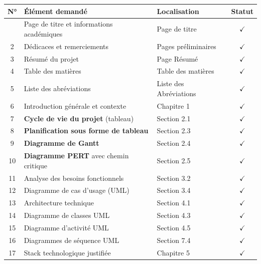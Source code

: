 \documentclass[12pt,a4paper,openany]{report}
\begin{document}
\begin{longtable}{clp{4.8cm}c}
  \toprule
  \textbf{N°} & \textbf{Élément demandé} & \textbf{Localisation} & \textbf{Statut} \\
  \midrule
  \endhead
  \bottomrule
  \endfoot
  1  & Page de titre et informations académiques      & Page de titre               & $\checkmark$ \\
  2  & Dédicaces et remerciements                     & Pages préliminaires         & $\checkmark$ \\
  3  & Résumé du projet                               & Page Résumé                 & $\checkmark$ \\
  4  & Table des matières                             & Table des matières          & $\checkmark$ \\
  5  & Liste des abréviations                         & Liste des Abréviations      & $\checkmark$ \\
  6  & Introduction générale et contexte              & Chapitre 1                  & $\checkmark$ \\
  7  & \textbf{Cycle de vie du projet} (tableau)      & Section 2.1                 & $\checkmark$ \\
  8  & \textbf{Planification sous forme de tableau}   & Section 2.3                 & $\checkmark$ \\
  9  & \textbf{Diagramme de Gantt}                    & Section 2.4                 & $\checkmark$ \\
  10 & \textbf{Diagramme PERT} avec chemin critique   & Section 2.5                 & $\checkmark$ \\
  11 & Analyse des besoins fonctionnels               & Section 3.2                 & $\checkmark$ \\
  12 & Diagramme de cas d'usage (UML)                 & Section 3.4                 & $\checkmark$ \\
  13 & Architecture technique                         & Section 4.1                 & $\checkmark$ \\
  14 & Diagramme de classes UML                       & Section 4.3                 & $\checkmark$ \\
  15 & Diagramme d'activité UML                       & Section 4.5                 & $\checkmark$ \\
  16 & Diagrammes de séquence UML                     & Section 7.4                 & $\checkmark$ \\
  17 & Stack technologique justifiée                  & Chapitre 5                  & $\checkmark$ \\

\end{longtable}
\end{document}
